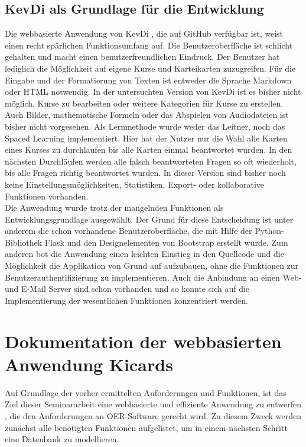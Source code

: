 \subsection{KevDi als Grundlage für die Entwicklung}
Die webbasierte Anwendung von KevDi \cite{kevdi}, die auf GitHub verfügbar ist, weist einen recht spärlichen Funktionsumfang auf. Die Benutzeroberfläche ist schlicht gehalten und macht einen benutzerfreundlichen Eindruck. Der Benutzer hat lediglich die Möglichkeit auf eigene Kurse und Karteikarten zuzugreifen. Für die Eingabe und der Formatierung von Texten ist entweder die Sprache Markdown oder HTML notwendig. In der untersuchten Version von KevDi ist es bisher nicht möglich, Kurse zu bearbeiten oder weitere Kategorien für Kurse zu erstellen. Auch Bilder, mathematische Formeln oder das Abspielen von Audiodateien ist bisher nicht vorgesehen. Als Lernmethode wurde weder das Leitner, noch das Spaced Learning implementiert. Hier hat der Nutzer nur die Wahl alle Karten eines Kurses zu durchlaufen bis alle Karten einmal beantwortet wurden. In den nächsten Durchläufen werden alle falsch beantworteten Fragen so oft wiederholt, bis alle Fragen richtig beantwortet wurden. In dieser Version sind bisher noch keine Einstellungsmöglichkeiten, Statistiken, Export- oder kollaborative Funktionen vorhanden. \\

\noindent Die Anwendung wurde trotz der mangelnden Funktionen als Entwicklungsgrundlage ausgewählt. Der Grund für diese Entscheidung ist unter anderem die schon vorhandene Benutzeroberfläche, die mit Hilfe der Python-Bibliothek Flask und den Designelementen von Bootstrap erstellt wurde. Zum anderen bot die Anwendung einen leichten Einstieg in den Quellcode und die Möglichkeit die Applikation von Grund auf aufzubauen, ohne die Funktionen zur Benutzerauthentifizierung zu implementieren. Auch die Anbindung an einen Web- und E-Mail Server sind schon vorhanden und so konnte sich auf die Implementierung der wesentlichen Funktionen konzentriert werden. \\



\section{Dokumentation der webbasierten Anwendung Kicards}
Auf Grundlage der vorher ermittelten Anforderungen und Funktionen, ist das Ziel dieser Seminararbeit eine webbasierte und effiziente Anwendung zu entwerfen \cite{kicards}, die den Anforderungen an OER-Software gerecht wird. Zu diesem Zweck werden zunächst alle benötigten Funktionen aufgelistet, um in einem nächsten Schritt eine Datenbank zu modellieren.


